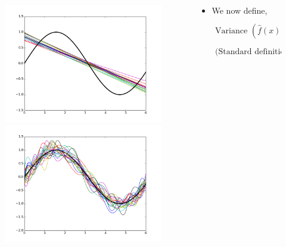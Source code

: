 \begin{frame}
	\begin{columns}
		\begin{column}{0.4\textwidth}
			\begin{figure}
				\centering
				\includegraphics[width=0.9\linewidth]{images/linear/19am.png}\\
				\includegraphics[width=0.9\linewidth]{images/complex/19bm.png}
				\caption{}
				\label{fig:simp}	
			\end{figure}
		\end{column}
		\begin{column}{0.6\textwidth}
			\begin{itemize}
				\justifying
				\setlength\itemsep{1em}
				\item<1-> We now define,\\
				\begin{align*}						\text{Variance } (\hat{f}(x))=E[(\hat{f}(x)-E[\hat{f}(x)])^2]\\\text{(Standard definition from statistics)}
				\end{align*}
										

\end{itemize}
\end{column}
\end{columns}
\end{frame}
